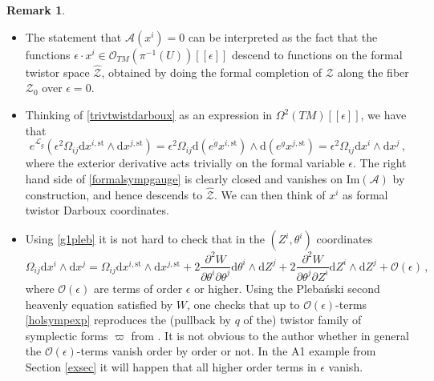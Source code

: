 \documentclass{article}
\theoremstyle{definition}
\newtheorem{remark}[theorem]{Remark}
\numberwithin{equation}{section}
\begin{document}
\begin{remark}
\begin{itemize}
\item The statement that $\mathcal{A}(x^i)=0$ can be interpreted as the fact that the functions $\epsilon \cdot x^i\in \mathcal{O}_{TM}(\pi^{-1}(U))[[\epsilon]]$ descend to functions on the formal twistor space $\widehat{\mathcal{Z}}$, obtained by doing the formal completion of $\mathcal{Z}$ along the fiber $\mathcal{Z}_{0}$ over $\epsilon =0$. 
\item Thinking of \eqref{trivtwistdarboux} as an expression in $\Omega^2(TM)[[\epsilon]]$, we have that
\begin{equation}\label{formalsympgauge}
    e^{\mathcal{L}_{\dot{g}}}(\epsilon^{2}\Omega_{ij}\mathrm{d}x^{i,\text{st}}\wedge \mathrm{d}x^{j,\text{st}})=\epsilon^{2}\Omega_{ij}\mathrm{d}(e^{\dot{g}}x^{i,\text{st}})\wedge \mathrm{d}(e^{\dot{g}}x^{j,\text{st}})=\epsilon^{2}\Omega_{ij}\mathrm{d}x^i\wedge \mathrm{d}x^j\,,
\end{equation}
where the exterior derivative acts trivially on the formal variable $\epsilon$. The right hand side of \eqref{formalsympgauge} is clearly closed and vanishes on $\text{Im}(\mathcal{A})$ by construction, and hence descends to $\widehat{\mathcal{Z}}$. We can then think of $x^i$ as formal twistor Darboux coordinates. 
\item Using \eqref{g1pleb} it is not hard to check that in the $(Z^i,\theta^i)$ coordinates
\begin{equation}\label{holsympexp}
    \Omega_{ij}\mathrm{d}x^i\wedge \mathrm{d}x^j=\Omega_{ij}\mathrm{d}x^{i,\text{st}}\wedge \mathrm{d}x^{j,\text{st}}+2\frac{\partial^2W}{\partial \theta^i\partial \theta^j} \mathrm{d}\theta^i\wedge \mathrm{d}Z^j + 2\frac{\partial^2W}{\partial \theta^j \partial Z^i}\mathrm{d}Z^i\wedge \mathrm{d}Z^j+\mathcal{O}(\epsilon)\,,
\end{equation}
where $\mathcal{O}(\epsilon)$ are terms of order $\epsilon$ or higher. Using the Pleba\'nski second heavenly equation satisfied by $W$, one checks that up to $\mathcal{O}(\epsilon)$-terms \eqref{holsympexp} reproduces the (pullback by $q$ of the) twistor family of symplectic forms $\varpi$ from \cite[Equation (24-26)]{TwistorJoyce}. It is not obvious to the author whether in general the $\mathcal{O}(\epsilon)$-terms vanish order by order or not. In the A1 example from Section \ref{exsec} it will happen that all higher order terms in $\epsilon$ vanish. 
\end{itemize}
\end{remark}
\end{document}
